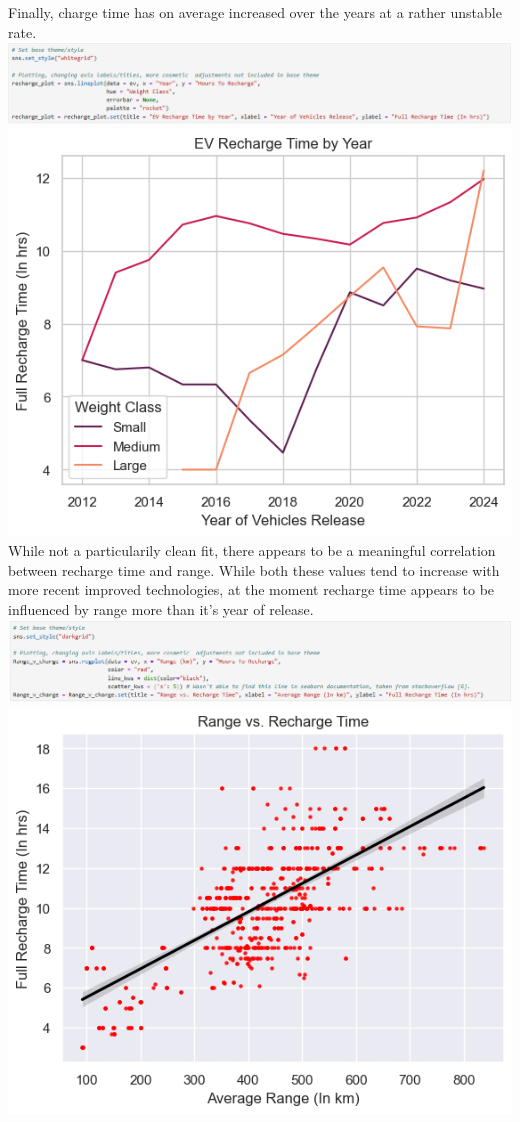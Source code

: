 \documentclass{article}
\begin{document}
{  \newpage
  Finally, charge time has on average increased over the years at a rather unstable rate.
  \newline \newline
  \includegraphics[width=\textwidth]{code_08.png}
  \includegraphics[width=\textwidth]{graph_06.png}
  \newpage
  While not a particularily clean fit, there appears to be a meaningful correlation between recharge time and range. While both
  these values tend to increase with more recent improved technologies, at the moment recharge time appears to be influenced by
  range more than it's year of release.
  \newline \newline
  \includegraphics[width=\textwidth]{code_09.png}
  \includegraphics[width=\textwidth]{graph_07.png}
}
\end{document}
